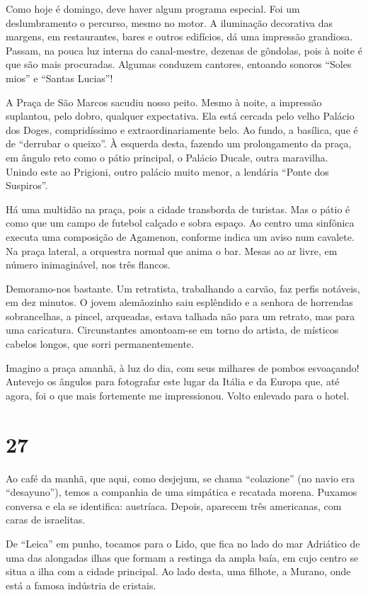 Como hoje é domingo, deve haver algum programa especial. Foi um deslumbramento o percurso, mesmo no motor. A iluminação decorativa das margens, em restaurantes, bares e outros edifícios, dá uma impressão grandiosa. Passam, na pouca luz interna do canal-mestre, dezenas de gôndolas, pois à noite é que são mais procuradas. Algumas conduzem cantores, entoando sonoros ``Soles mios'' e ``Santas Lucias''!

A Praça de São Marcos sacudiu nosso peito. Mesmo à noite, a impressão suplantou, pelo dobro, qualquer expectativa. Ela está cercada pelo velho Palácio dos Doges, compridíssimo e extraordinariamente belo. Ao fundo, a basílica, que é de ``derrubar o queixo''. À esquerda desta, fazendo um prolongamento da praça, em ângulo reto como o pátio principal, o Palácio Ducale, outra maravilha. Unindo este ao Prigioni, outro palácio muito menor, a lendária ``Ponte dos Suspiros''.

Há uma multidão na praça, pois a cidade transborda de turistas. Mas o pátio é como que um campo de futebol calçado e sobra espaço. Ao centro uma sinfônica executa uma composição de Agamenon, conforme indica um aviso num cavalete. Na praça lateral, a orquestra normal que anima o bar. Mesas ao ar livre, em número inimaginável, nos três flancos.

Demoramo-nos bastante. Um retratista, trabalhando a carvão, faz perfis notáveis, em dez minutos. O jovem alemãozinho saiu esplêndido e a senhora de horrendas sobrancelhas, a pincel, arqueadas, estava talhada não para um retrato, mas para uma caricatura. Circunstantes amontoam-se em torno do artista, de místicos cabelos longos, que sorri permanentemente.

Imagino a praça amanhã, à luz do dia, com seus milhares de pombos esvoaçando! Antevejo os ângulos para fotografar este lugar da Itália e da Europa que, até agora, foi o que mais fortemente me impressionou. Volto enlevado para o hotel.

\section*{27 \adfflatleafright {}}
Ao café da manhã, que aqui, como desjejum, se chama ``colazione'' (no navio era ``desayuno''), temos a companhia de uma simpática e recatada morena. Puxamos conversa e ela se identifica: austríaca. Depois, aparecem três americanas, com caras de israelitas.

De ``Leica'' em punho, tocamos para o Lido, que fica no lado do mar Adriático de uma das alongadas ilhas que formam a restinga da ampla baía, em cujo centro se situa a ilha com a cidade principal. Ao lado desta, uma filhote, a Murano, onde está a famosa indústria de cristais.

